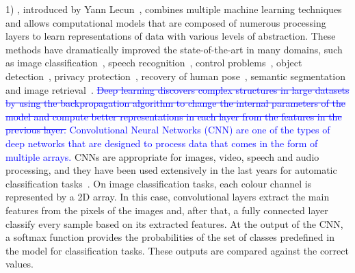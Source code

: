 \documentclass[journal]{IEEEtran}
\begin{document}
	1) , introduced by Yann Lecun~\cite{lecun2015deep}, combines multiple machine learning techniques and allows computational models that are composed of numerous processing layers to learn representations of data with various levels of abstraction. These methods have dramatically improved the state-of-the-art in many domains, such as image classification~\cite{cirecsan2012multi,he2016deep,krizhevsky2012imagenet}, speech recognition~\cite{hinton2012deep}, control problems~\cite{mnih2015human}, object detection~\cite{jiang2016speed,girshick2014rich}, privacy protection~\cite{yu2017iprivacy}, recovery of human pose~\cite{hong2015multimodal}, semantic segmentation~\cite{long2015fully} and image retrieval~\cite{li2015weakly}. \textcolor{blue}{\sout{Deep learning discovers complex structures in large datasets by using the backpropagation algorithm to change the internal parameters of the model and compute better representations in each layer from the features in the previous layer.} Convolutional Neural Networks (CNN) are one of the types of deep networks that are designed to process data that comes in the form of multiple arrays.} CNNs are appropriate for images, video, speech and audio processing, and they have been used extensively in the last years for automatic classification tasks~\cite{dong2014learning,sun2013deep,ronneberger2015u}. On image classification tasks, each colour channel is represented by a 2D array. In this case, convolutional layers extract the main features from the pixels of the images and, after that, a fully connected layer classify every sample based on its extracted features. At the output of the CNN, a softmax function provides the probabilities of the set of classes predefined in the model for classification tasks. These outputs are compared against the correct values.
	
\end{document}
